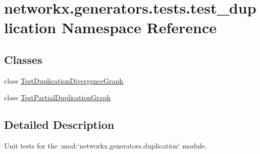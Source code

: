 \hypertarget{namespacenetworkx_1_1generators_1_1tests_1_1test__duplication}{}\section{networkx.\+generators.\+tests.\+test\+\_\+duplication Namespace Reference}
\label{namespacenetworkx_1_1generators_1_1tests_1_1test__duplication}
\subsection*{Classes}
\begin{DoxyCompactItemize}
\item 
class \hyperlink{classnetworkx_1_1generators_1_1tests_1_1test__duplication_1_1TestDuplicationDivergenceGraph}{Test\+Duplication\+Divergence\+Graph}
\item 
class \hyperlink{classnetworkx_1_1generators_1_1tests_1_1test__duplication_1_1TestPartialDuplicationGraph}{Test\+Partial\+Duplication\+Graph}
\end{DoxyCompactItemize}


\subsection{Detailed Description}
\begin{DoxyVerb}Unit tests for the :mod:`networkx.generators.duplication` module.\end{DoxyVerb}
 